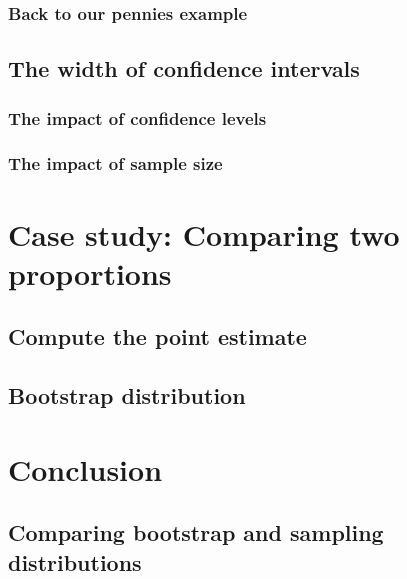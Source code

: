 \documentclass[12pt, krantz2,]{krantz}
\begin{document}
\hypertarget{back-to-our-pennies-example}{%
\subsubsection*{Back to our pennies example}\label{back-to-our-pennies-example}}


\hypertarget{the-width-of-confidence-intervals}{%
\subsection*{The width of confidence intervals}\label{the-width-of-confidence-intervals}}


\hypertarget{the-impact-of-confidence-levels}{%
\subsubsection*{The impact of confidence levels}\label{the-impact-of-confidence-levels}}


\hypertarget{the-impact-of-sample-size}{%
\subsubsection*{The impact of sample size}\label{the-impact-of-sample-size}}


\hypertarget{case-study-two-prop-ci}{%
\section{Case study: Comparing two proportions}\label{case-study-two-prop-ci}}

\hypertarget{compute-the-point-estimate}{%
\subsection{Compute the point estimate}\label{compute-the-point-estimate}}

\hypertarget{bootstrap-distribution}{%
\subsection{Bootstrap distribution}\label{bootstrap-distribution}}

\hypertarget{ci-conclusion}{%
\section{Conclusion}\label{ci-conclusion}}

\hypertarget{comparing-bootstrap-and-sampling-distributions}{%
\subsection{Comparing bootstrap and sampling distributions}\label{comparing-bootstrap-and-sampling-distributions}}
\end{document}
